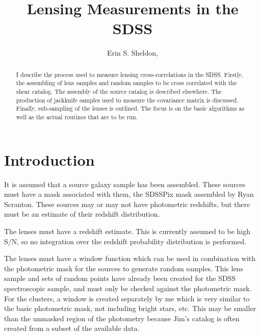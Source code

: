\documentclass{emulateapj}
\begin{document}
\title{Lensing Measurements in the SDSS}

\author{
Erin S. Sheldon,}



\begin{abstract}
I describe the process used to measure lensing cross-correlations in the SDSS.
Firstly, the assembling of lens samples and random samples to be cross
correlated with the shear catalog.  The assembly of the source catalog is 
described elsewhere.  The production of jackknife samples used
to measure the covariance matrix is discussed.  Finally, sub-sampling of
the lenses is outlined.  The focus is on the basic algorithms as well as the
actual routines that are to be run.
\end{abstract}



\section{Introduction} \label{intro}

It is assumed that a source galaxy sample has been assembled. These sources
must have a mask associated with them, the SDSSPix mask assembled by
Ryan Scranton.  These sources may or may not have photometric redshifts, 
but there must be an estimate of their redshift distribution.  

The lenses must have a redshift estimate.  This is currently assumed to
be high S/N, so no integration over the redshift probability distribution is 
performed.

The lenses must have a window function which can be used in combination with
the photometric mask for the sources to generate random samples. This lens
sample and sets of random points have already been created for the SDSS
spectroscopic sample, and must only be checked against the photometric mask.
For the clusters, a window is created separately by me which is very similar to
the basic photometric mask, not including bright stars, etc. This may be
smaller than the unmasked region of the photometry because Jim's catalog is
often created from a subset of the available data.
\end{document}
